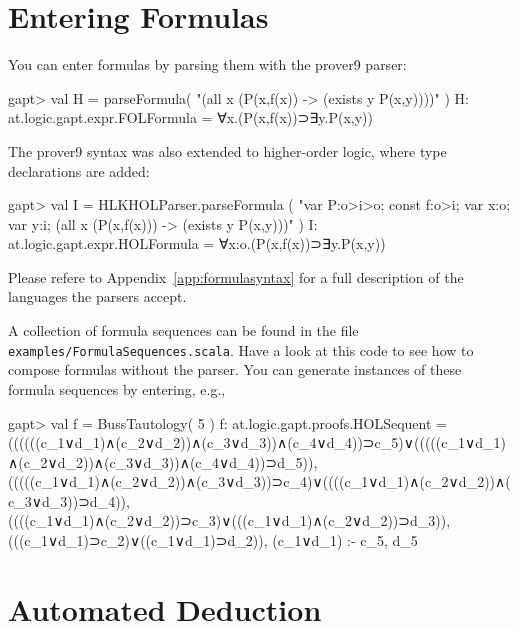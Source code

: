 \documentclass[a4paper,11pt]{article}
\newcommand{\cli}[1]{{\tt {#1}}}
\begin{document}
\section{Entering Formulas}\label{sec.entering_formulas}
You can enter formulas by parsing them with the prover9\cite{Prover9Input} parser:
%
\begin{clilisting}
gapt> val H = parseFormula( "(all x (P(x,f(x)) -> (exists y P(x,y))))" )
H: at.logic.gapt.expr.FOLFormula = ∀x.(P(x,f(x))⊃∃y.P(x,y))

\end{clilisting}
%
The prover9 syntax was also extended to higher-order logic, where type declarations are added:
%
\begin{clilisting}
gapt> val I = HLKHOLParser.parseFormula ( "var P:o>i>o; const f:o>i; var x:o; var y:i; (all x (P(x,f(x))) -> (exists y P(x,y)))" )
I: at.logic.gapt.expr.HOLFormula = ∀x:o.(P(x,f(x))⊃∃y.P(x,y))

\end{clilisting}

Please refere to Appendix~\ref{app:formulasyntax} for a full description of the languages the parsers accept.

A collection of formula sequences can be found in the file \cli{examples/FormulaSequences.scala}.
Have a look at this code to see how to compose formulas without the parser.
You can generate instances of these formula sequences by entering, e.g.,
%
\begin{clilisting}
gapt> val f = BussTautology( 5 )
f: at.logic.gapt.proofs.HOLSequent = ((((((c_1∨d_1)∧(c_2∨d_2))∧(c_3∨d_3))∧(c_4∨d_4))⊃c_5)∨(((((c_1∨d_1)∧(c_2∨d_2))∧(c_3∨d_3))∧(c_4∨d_4))⊃d_5)), (((((c_1∨d_1)∧(c_2∨d_2))∧(c_3∨d_3))⊃c_4)∨((((c_1∨d_1)∧(c_2∨d_2))∧(c_3∨d_3))⊃d_4)), ((((c_1∨d_1)∧(c_2∨d_2))⊃c_3)∨(((c_1∨d_1)∧(c_2∨d_2))⊃d_3)), (((c_1∨d_1)⊃c_2)∨((c_1∨d_1)⊃d_2)), (c_1∨d_1) :- c_5, d_5

\end{clilisting}



\section{Automated Deduction}
  
\end{document}
